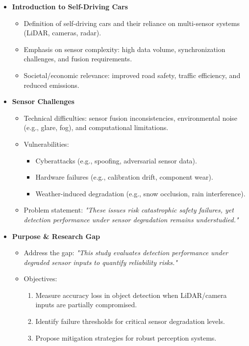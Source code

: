 \begin{itemize}
    \item \textbf{Introduction to Self-Driving Cars}
    \begin{itemize}
        \item Definition of self-driving cars and their reliance on multi-sensor systems (LiDAR, cameras, radar).
        \item Emphasis on sensor complexity: high data volume, synchronization challenges, and fusion requirements.
        \item Societal/economic relevance: improved road safety, traffic efficiency, and reduced emissions.
    \end{itemize}
    
    \item \textbf{Sensor Challenges}
    \begin{itemize}
        \item Technical difficulties: sensor fusion inconsistencies, environmental noise (e.g., glare, fog), and computational limitations.
        \item Vulnerabilities: 
        \begin{itemize}
            \item Cyberattacks (e.g., spoofing, adversarial sensor data).
            \item Hardware failures (e.g., calibration drift, component wear).
            \item Weather-induced degradation (e.g., snow occlusion, rain interference).
        \end{itemize}
        \item Problem statement: \textit{"These issues risk catastrophic safety failures, yet detection performance under sensor degradation remains understudied."}
    \end{itemize}
    
    \item \textbf{Purpose \& Research Gap}
    \begin{itemize}
        \item Address the gap: \textit{"This study evaluates detection performance under degraded sensor inputs to quantify reliability risks."}
        \item Objectives:
        \begin{enumerate}
            \item Measure accuracy loss in object detection when LiDAR/camera inputs are partially compromised.
            \item Identify failure thresholds for critical sensor degradation levels.
            \item Propose mitigation strategies for robust perception systems.
        \end{enumerate}
    \end{itemize}
    

\end{itemize}

